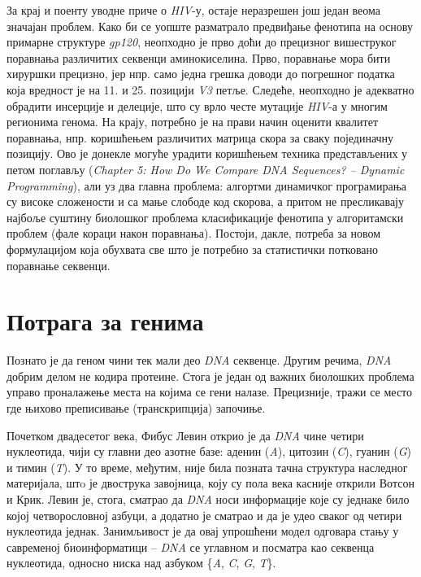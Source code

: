 \documentclass[12pt,oneside]{memoir}
\begin{document}
За крај и поенту уводне приче о \textit{HIV}-у, остаје неразрешен још један веома значајан проблем. Како би се уопште разматрало предвиђање фенотипа на основу примарне структуре \textit{gp120}, неопходно је прво доћи до прецизног вишеструког поравнања различитих секвенци аминокиселина. Прво, поравнање мора бити хируршки прецизно, јер нпр. само једна грешка доводи до погрешног податка која вредност је на 11. и 25. позицији \textit{V3} петље. Следеће, неопходно је адекватно обрадити инсерције и делеције, што су врло честе мутације \textit{HIV}-а у многим регионима генома. На крају, потребно је на прави начин оценити квалитет поравнања, нпр. коришћењем различитих матрица скора за сваку појединачну позицију. Ово је донекле могуће урадити коришћењем техника представљених у петом поглављу (\textit{Chapter 5: How Do We Compare DNA Sequences? -- Dynamic Programming}), али уз два главна проблема: алгортми динамичког програмирања су високе сложености и са мање слободе код скорова, а притом не пресликавају најбоље суштину биолошког проблема класификације фенотипа у алгоритамски проблем (фале кораци након поравнања). Постоји, дакле, потреба за новом формулацијом која обухвата све што је потребно за статистички потковано поравнање секвенци.

\section{Потрага за генима}
Познато је да геном чини тек мали део \textit{DNA} секвенце. Другим речима, \textit{DNA} добрим делом не кодира протеине. Стога је један од важних биолошких проблема управо проналажење места на којима се гени налазе. Прецизније, тражи се место где њихово преписивање (транскрипција) започиње.

Почетком двадесетог века, Фибус Левин открио је да \textit{DNA} чине четири нуклеотида, чији су главни део азотне базе: аденин (\textit{A}), цитозин (\textit{C}), гуанин (\textit{G}) и тимин (\textit{T}). У то време, међутим, није била позната тачна структура наследног материјала, штo је двострука завојница, коју су пола века касније открили Вотсон и Крик. Левин је, стога, сматрао да \textit{DNA} носи информације које су једнаке било којој четворословној азбуци, а додатно је сматрао и да је удео сваког од четири нуклеотида једнак. Занимљивост је да овај упрошћени модел одговара стању у савременој биоинформатици -- \textit{DNA} се углавном и посматра као секвенца нуклеотида, односно ниска над азбуком \{\textit{A}, \textit{C}, \textit{G}, \textit{T}\}.
\end{document}
